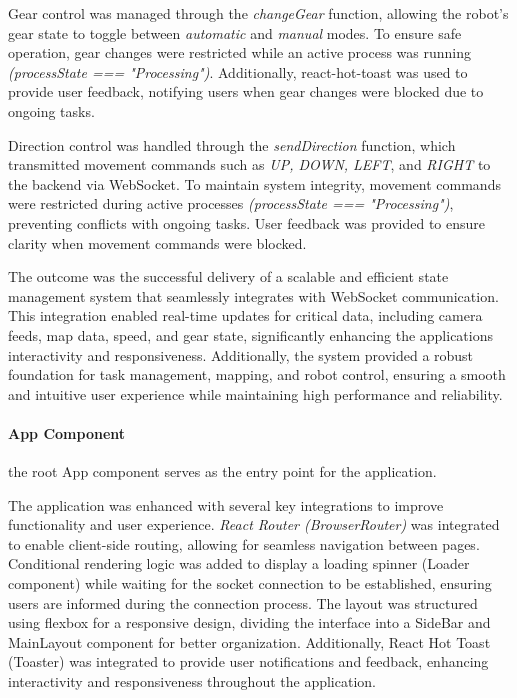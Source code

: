 \documentclass[../../main]{subfiles}
\begin{document}
Gear control was managed through the \emph{changeGear} function,
allowing the robot's gear state to toggle between \emph{automatic} and
\emph{manual} modes. To ensure safe operation, gear changes were
restricted while an active process was running \emph{(processState ===
"Processing")}. Additionally, react-hot-toast was used to provide user
feedback, notifying users when gear changes were blocked due to ongoing
tasks.

Direction control was handled through the \emph{sendDirection} function,
which transmitted movement commands such as \emph{UP, DOWN, LEFT}, and
\emph{RIGHT} to the backend via WebSocket. To maintain system integrity,
movement commands were restricted during active processes
\emph{(processState === "Processing")}, preventing conflicts with
ongoing tasks. User feedback was provided to ensure clarity when
movement commands were blocked.

The outcome was the successful delivery of a scalable and efficient
state management system that seamlessly integrates with WebSocket
communication. This integration enabled real-time updates for critical
data, including camera feeds, map data, speed, and gear state,
significantly enhancing the application\textquotesingle s interactivity
and responsiveness. Additionally, the system provided a robust
foundation for task management, mapping, and robot control, ensuring a
smooth and intuitive user experience while maintaining high performance
and reliability.
\newpage
\paragraph{App Component}

the root App component serves as the entry point for the application.

The application was enhanced with several key integrations to improve
functionality and user experience. \emph{React Router (BrowserRouter)}
was integrated to enable client-side routing, allowing for seamless
navigation between pages. Conditional rendering logic was added to
display a loading spinner (Loader component) while waiting for the
socket connection to be established, ensuring users are informed during
the connection process. The layout was structured using flexbox for a
responsive design, dividing the interface into a SideBar and MainLayout
component for better organization. Additionally, React Hot Toast
(Toaster) was integrated to provide user notifications and feedback,
enhancing interactivity and responsiveness throughout the application.
\end{document}
